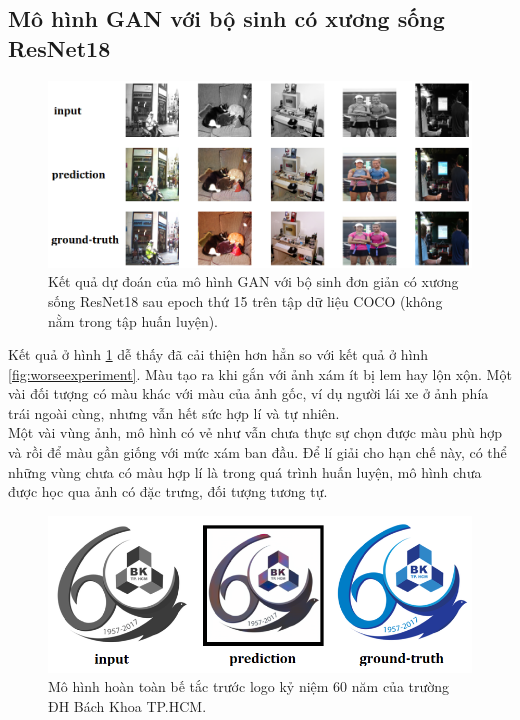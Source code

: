 \documentclass[a4paper, 12pt]{article}
\begin{document}
\subsection{Mô hình GAN với bộ sinh có xương sống ResNet18}
\begin{figure}[!h]
\captionsetup{width=0.8\textwidth}
\centering
\includegraphics[width=15cm]{images/4_1.png}
\caption{Kết quả dự đoán của mô hình GAN với bộ sinh đơn giản có xương sống ResNet18 sau epoch thứ 15 trên tập dữ liệu COCO (không nằm trong tập huấn luyện).}
\label{fig:betterexperiment}
\end{figure}

\noindent
Kết quả ở hình \ref{fig:betterexperiment} dễ thấy đã cải thiện hơn hẳn so với kết quả ở hình \ref{fig:worseexperiment}. Màu tạo ra khi gắn với ảnh xám ít bị lem hay lộn xộn. Một vài đối tượng có màu khác với màu của ảnh gốc, ví dụ người lái xe ở ảnh phía trái ngoài cùng, nhưng vẫn hết sức hợp lí và tự nhiên.\vspace{5pt}\\
Một vài vùng ảnh, mô hình có vẻ như vẫn chưa thực sự chọn được màu phù hợp và rồi để màu gần giống với mức xám ban đầu. Để lí giải cho hạn chế này, có thể những vùng chưa có màu hợp lí là trong quá trình huấn luyện, mô hình chưa được học qua ảnh có đặc trưng, đối tượng tương tự.\vspace{5pt}

\begin{figure}[!h]
\captionsetup{width=0.8\textwidth}
\centering
\includegraphics[width=15cm]{images/4_12.PNG}
\caption{Mô hình hoàn toàn bế tắc trước logo kỷ niệm 60 năm của trường ĐH Bách Khoa TP.HCM.}
\label{fig:failcolorlogo}
\end{figure}
\end{document}
